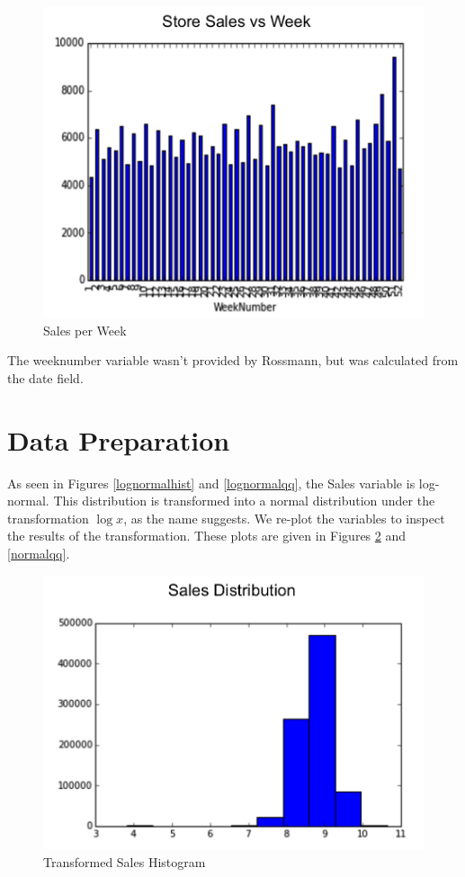 \documentclass[DIV=calc, paper=a4, fontsize=11pt]{scrartcl}	 %
\begin{document}
\begin{figure}[!htbp]
\centering
\caption{Sales per Week}
\label{seasonality}
\includegraphics[scale=0.65]{figures/seasonality.png}
\end{figure} 

The weeknumber variable wasn't provided by Rossmann, but was calculated from the date field.


\section*{Data Preparation}

As seen in Figures \ref{lognormalhist} and \ref{lognormalqq}, the Sales variable is log-normal. This distribution is transformed into a normal distribution under the transformation $\log{x}$, as the name suggests. We re-plot the variables to inspect the results of the transformation. These plots are given in Figures \ref{normalhist} and \ref{normalqq}.


\begin{figure}[!htbp]
\centering
\caption{Transformed Sales Histogram}
\label{normalhist}
\includegraphics[scale=0.75]{figures/salesnormalhist.png}
\end{figure} 
\end{document}
